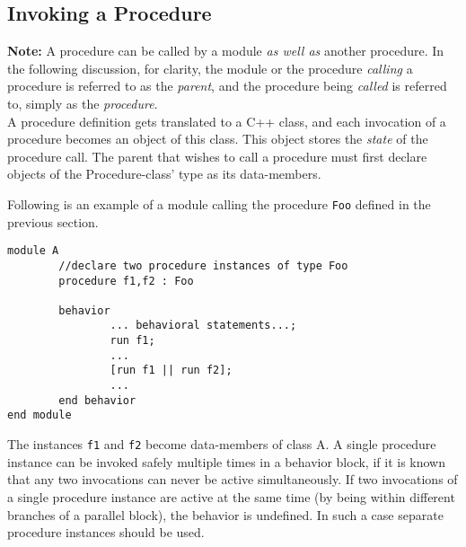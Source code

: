 	\subsection{Invoking a Procedure}
	\textbf{Note:} A procedure can be called by a module \emph{as well as} another
	procedure.  In the following discussion, for clarity, the module or the
	procedure \emph{calling} a procedure is referred to as the
	\emph{parent}, and the procedure being \emph{called} is referred to,
	simply as the \emph{procedure}.\\

	A procedure definition gets translated to a C++ class, and 
	each invocation of a procedure becomes an object of this class. 
	This object stores the \emph{state} of the procedure call.
	The parent that wishes to call a procedure 
	must first declare objects of the Procedure-class' type as its
	data-members.

	Following is an example of a module calling the procedure \texttt{Foo}
	defined in the previous section.
\begin{verbatim}
module A
        //declare two procedure instances of type Foo
        procedure f1,f2 : Foo

        behavior 
                ... behavioral statements...;
                run f1;
                ...
                [run f1 || run f2];
                ...
        end behavior
end module
\end{verbatim}
	The instances \texttt{f1} and \texttt{f2} become data-members
	of class A.	
	A single procedure instance can be invoked safely multiple times in a
	behavior block, if it is known that any two invocations can never be
	active simultaneously.  If two invocations of a single procedure
	instance are active at the same time (by being within different branches
	of a parallel block), the behavior is undefined.
	In such a case separate procedure instances should be used.


